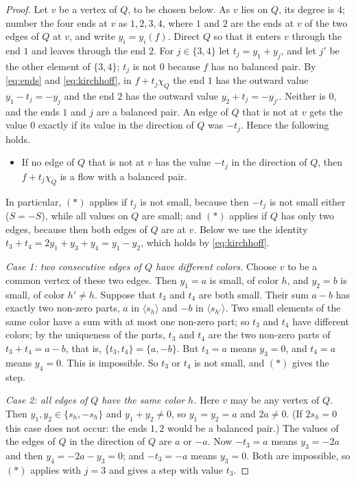 \documentclass[11pt]{article}
\theoremstyle{definition}
\begin{document}
\begin{proof}
Let $v$ be a vertex of $Q$, to be chosen below. As $v$ lies on $Q$, its degree is $4$; number the four ends at $v$ as $1,2,3,4$, where $1$ and $2$ are the ends at $v$ of the two edges of $Q$ at $v$, and write
$y_i=y_i(f)$. Direct $Q$ so that it enters $v$ through the end $1$ and leaves through the end $2$. For $j\in\{3,4\}$
let $t_j=y_1+y_j$, and let $j'$ be the other element of $\{3,4\}$; $t_j$ is not $0$ because $f$ has no balanced pair. By \eqref{eq:ends} and
\eqref{eq:kirchhoff}, in $f+t_j\chi_Q$ the end $1$ has the outward value $y_1-t_j=-y_j$ and the end $2$ has the
outward value $y_2+t_j=-y_{j'}$. Neither is $0$, and the ends $1$ and $j$ are a balanced pair. An edge of $Q$ that is not at $v$ gets
the value $0$ exactly if its value in the direction of $Q$ was $-t_j$. Hence the following holds.
\begin{itemize}
\item[$(\ast)$] If no edge of $Q$ that is not at $v$ has the value $-t_j$ in the direction of $Q$, then
$f+t_j\chi_Q$ is a flow with a balanced pair.
\end{itemize}
In particular, $(\ast)$ applies if $t_j$ is not small, because then $-t_j$ is not small either ($S=-S$), while all
values on $Q$ are small; and $(\ast)$ applies if $Q$ has only two edges, because then both edges of $Q$ are at $v$. Below
we use the identity $t_3+t_4=2y_1+y_3+y_4=y_1-y_2$, which holds by \eqref{eq:kirchhoff}.

\emph{Case 1: two consecutive edges of $Q$ have different colors.} Choose $v$ to be a common vertex of these two edges. Then $y_1=a$ is
small, of color $h$, and $y_2=b$ is small, of color $h'\ne h$. Suppose that $t_3$ and $t_4$ are both small. Their sum
$a-b$ has exactly two non-zero parts, $a$ in $\langle s_h\rangle$ and $-b$ in $\langle s_{h'}\rangle$. Two small elements
of the same color have a sum with at most one non-zero part; so $t_3$ and $t_4$ have different colors; by the uniqueness of the parts, $t_3$ and $t_4$ are the two non-zero parts of $t_3+t_4=a-b$, that is, $\{t_3,t_4\}=\{a,-b\}$. But $t_3=a$ means $y_3=0$, and $t_4=a$ means $y_4=0$. This is
impossible. So $t_3$ or $t_4$ is not small, and $(\ast)$ gives the step.

\emph{Case 2: all edges of $Q$ have the same color $h$.} Here $v$ may be any vertex of $Q$. Then $y_1,y_2\in\{s_h,-s_h\}$
and $y_1+y_2\ne 0$, so $y_1=y_2=a$ and $2a\ne 0$. (If $2s_h=0$ this case does not occur: the ends $1,2$ would be a
balanced pair.) The values of the edges of $Q$ in the direction of $Q$ are $a$ or $-a$. Now $-t_3=a$ means
$y_3=-2a$ and then $y_4=-2a-y_3=0$; and $-t_3=-a$ means $y_3=0$. Both are impossible, so $(\ast)$ applies with $j=3$ and gives a step with value $t_3$.
\end{proof}
\end{document}

